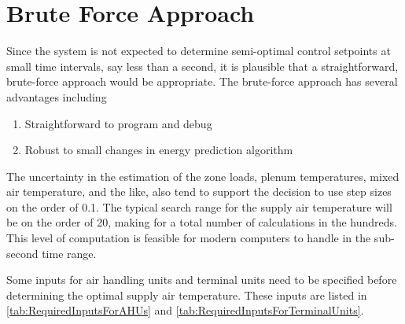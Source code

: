 
\section{Brute Force Approach}

Since the system is not expected to determine semi-optimal
control setpoints at small time intervals, say less than a second, it is
plausible that a straightforward, brute-force approach would be
appropriate.  The brute-force approach has several advantages including
\begin{enumerate}
        \item Straightforward to program and debug
        \item Robust to small changes in energy prediction algorithm
\end{enumerate}

The uncertainty in the estimation of the zone loads, plenum
temperatures, mixed air temperature, and the like, also tend to support
the decision to use step sizes on the order of  \SI{0.1}{\degreeF}. The
typical search range for the supply air temperature will be on the order
of \SI{20}{\degreeF}, making for a total number of calculations in the
hundreds.  This level of computation is feasible for modern
computers to handle in the sub-second time range.

Some inputs for air handling units and terminal units need to be
specified before determining the optimal supply air temperature. These
inputs are listed in \tableref{} \ref{tab:RequiredInputsForAHUs} and
\ref{tab:RequiredInputsForTerminalUnits}.

